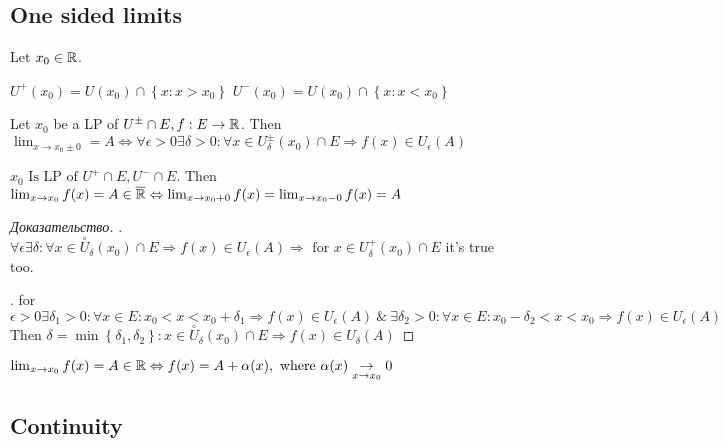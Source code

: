 \subsection{One sided limits}

Let $x_0 \in \mathbb{R}$.

\begin{definition}[]
    $U^{+}(x_0) = U(x_0) \cap \left\{ x: x > x_0 \right \} $
    $U^{-}(x_0) = U(x_0) \cap \left\{ x: x < x_0 \right \} $
\end{definition}

\begin{definition}[]
    Let $x_0$ be a LP of $U^{\pm} \cap E, f: E \to \mathbb{R}$. Then $\lim_{x \to x_0 \pm 0} = A \Leftrightarrow \forall \epsilon > 0 \exists \delta > 0: \forall x \in U_\delta^\pm(x_0) \cap E \Rightarrow f(x) \in U_\epsilon(A)$
\end{definition}

\begin{theorem}
   $x_0 \text{ Is LP of } U^{+} \cap E, U^{-} \cap E$. Then $\lim_{x \to x_0} f(x) = A \in \overline{\mathbb{R}} \Leftrightarrow \lim_{x \to x_0+0}f(x) = \lim_{x \to x_0-0} f(x) = A $
\end{theorem}

\begin{proof}[Доказательство]
    \fbox{$ \Rightarrow $}. $\forall \epsilon \exists \delta: \forall x \in \overset{\circ} U_\delta (x_0) \cap E \Rightarrow f(x) \in U_\epsilon(A) \Rightarrow \text{ for } x \in U_\delta^+ (x_0) \cap E$ it's true too.

    \fbox{$ \Leftarrow  $}. for $\epsilon > 0 \exists \delta_1 > 0: \forall x \in E: x_0 < x < x_0 + \delta_1 \Rightarrow f(x) \in U_\epsilon (A) \ \& \ \exists \delta_2 > 0: \forall x \in E: x_0 - \delta_2 < x < x_0 \Rightarrow f(x) \in U_\epsilon (A)$
    Then $\delta = \min \left\{ \delta_1, \delta_2 \right \}: x \in \overset{\circ} U_\delta (x_0) \cap E \Rightarrow f(x) \in U_\delta(A) $
\end{proof}

\begin{theorem}
    $\lim_{x \to x_0} f(x) = A \in \mathbb{R} \Leftrightarrow f(x) = A + \alpha(x), \text{ where } \alpha(x) \underset{x \to x_0} \to 0$
\end{theorem}

\subsection{Continuity}

